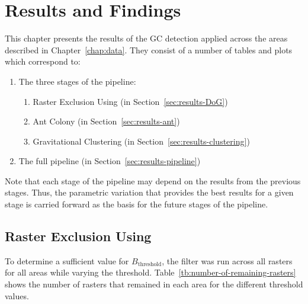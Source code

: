 \chapter{\label{chap:results}Results and Findings}

This chapter presents the results of the GC detection applied across the areas described in Chapter~{\ref{chap:data}}. They consist of a number of tables and plots which correspond to:
\begin{enumerate}
    \item The three stages of the pipeline:
          \begin{enumerate}[label=\roman*.]
              \item Raster Exclusion Using \blobdog{} (in Section~{\ref{sec:results-DoG}})
              \item Ant Colony (in Section~\ref{sec:results-ant})
              \item Gravitational Clustering (in Section~\ref{sec:results-clustering})
          \end{enumerate}
    \item The full pipeline (in Section~\ref{sec:results-pipeline})
\end{enumerate}

Note that each stage of the pipeline may depend on the results from the previous stages. Thus, the parametric variation that provides the best results for a given stage is carried forward as the basis for the future stages of the pipeline.

\section{\label{sec:results-DoG}Raster Exclusion Using \blobdog{}}

To determine a sufficient value for $B_{\text{threshold}}$, the \blobdog{} filter was run across all rasters for all areas while varying the threshold. Table~\ref{tb:number-of-remaining-rasters} shows the number of rasters that remained in each area for the different threshold values.

